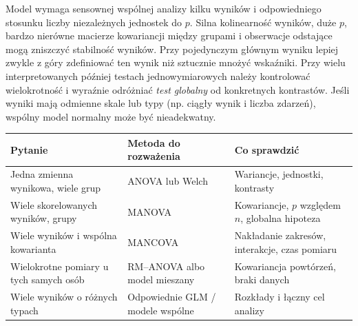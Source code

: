 \begin{uwaga}
Model wymaga sensownej wspólnej analizy kilku wyników i odpowiedniego stosunku liczby niezależnych jednostek do $p$. Silna kolinearność wyników, duże $p$, bardzo nierówne macierze kowariancji między grupami i obserwacje odstające mogą zniszczyć stabilność wyników. Przy pojedynczym głównym wyniku lepiej zwykle z góry zdefiniować ten wynik niż sztucznie mnożyć wskaźniki. Przy wielu interpretowanych później testach jednowymiarowych należy kontrolować wielokrotność i wyraźnie odróżniać \emph{test globalny} od konkretnych kontrastów. Jeśli wyniki mają odmienne skale lub typy (np. ciągły wynik i liczba zdarzeń), wspólny model normalny może być nieadekwatny.
\end{uwaga}

\begin{center}\small
\begin{tabular}{>{\raggedright\arraybackslash}p{}>{\raggedright\arraybackslash}p{}>{\raggedright\arraybackslash}p{}}
\toprule
\textbf{Pytanie} & \textbf{Metoda do rozważenia} & \textbf{Co sprawdzić}\\
\midrule
Jedna zmienna wynikowa, wiele grup & ANOVA lub Welch & Wariancje, jednostki, kontrasty\\
Wiele skorelowanych wyników, grupy & MANOVA & Kowariancje, $p$ względem $n$, globalna hipoteza\\
Wiele wyników i wspólna kowarianta & MANCOVA & Nakładanie zakresów, interakcje, czas pomiaru\\
Wielokrotne pomiary u tych samych osób & RM--ANOVA albo model mieszany & Kowariancja powtórzeń, braki danych\\
Wiele wyników o różnych typach & Odpowiednie GLM / modele wspólne & Rozkłady i łączny cel analizy\\
\bottomrule
\end{tabular}
\end{center}

